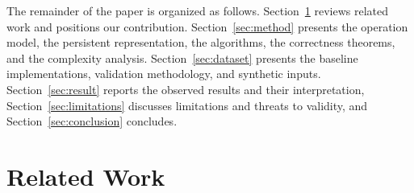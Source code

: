 \documentclass[conference]{IEEEtran}
\begin{document}
The remainder of the paper is organized as follows. Section~\ref{sec:rel-work} reviews related
work and positions our contribution. Section~\ref{sec:method} presents the operation model, the
persistent representation, the algorithms, the correctness theorems, and the complexity analysis.
Section~\ref{sec:dataset} presents the baseline implementations, validation methodology, and
synthetic inputs. Section~\ref{sec:result} reports the observed results and their interpretation,
Section~\ref{sec:limitations} discusses limitations and threats to validity, and
Section~\ref{sec:conclusion} concludes.

\section{Related Work}
\label{sec:rel-work}
\end{document}
